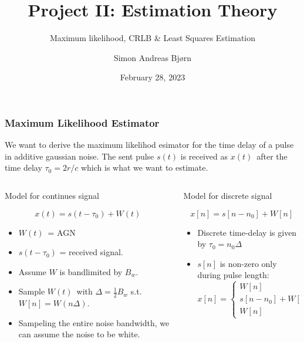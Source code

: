 \documentclass[compress]{beamer}
\title{Project II: Estimation Theory}
\subtitle{Maximum likelihood, CRLB \& Least Squares Estimation}
\author{\Large Simon Andreas Bjørn}
\date{\large February 28, 2023}
\begin{document}
\begin{frame}
    \maketitle
\end{frame}

\begin{frame} %
    \frametitle{Maximum Likelihood Estimator}
    We want to derive the maximum likelihod esimator for the time delay of a pulse
    in additive gaussian noise. The sent pulse $s(t)$ is received as $x(t)$ after
    the time delay $\tau_0 = 2r/c$ which is what we want to estimate.
    \medskip
    \begin{columns}[t]
        \begin{column}{0.4\textwidth}
            \centerline{Model for continues signal}
            \begin{equation*}
                x(t) = s(t-\tau_0) + W(t)
            \end{equation*}

            \begin{itemize}
                \item $W(t)$ = AGN
                \item $s(t-\tau_0)$ = received signal. 
                \item Assume $W$ is bandlimited by $B_w$.
                \item Sample $W(t)$ with $\Delta=\frac{1}{2}B_w$ s.t. $W[n]=W(n\Delta)$.
                \item Sampeling the entire noise bandwidth, we can assume the noise to be
                white. 
            \end{itemize}
        \end{column}
        \begin{column}{0.7\textwidth}
            \centerline{Model for discrete signal}
            \begin{equation*}
                x[n] = s[n-n_0] + W[n]
            \end{equation*}
            \begin{itemize}
                \item Discrete time-delay is given by $\tau_0=n_0\Delta$
                \item $s[n]$ is non-zero only during pulse length: \\
                    \begin{equation*}
                        x[n] = 
                        \begin{cases}
                            W[n] & , 0 \le n \le n_0-1 \\
                            s[n-n_0]+W[n] & , n_0 \le n < n_0 + M \\
                            W[n] & , n_0 + M \le n \le N
                        \end{cases}
                    \end{equation*}
            \end{itemize}
        \end{column}
    \end{columns}
\end{frame} %
\end{document}
